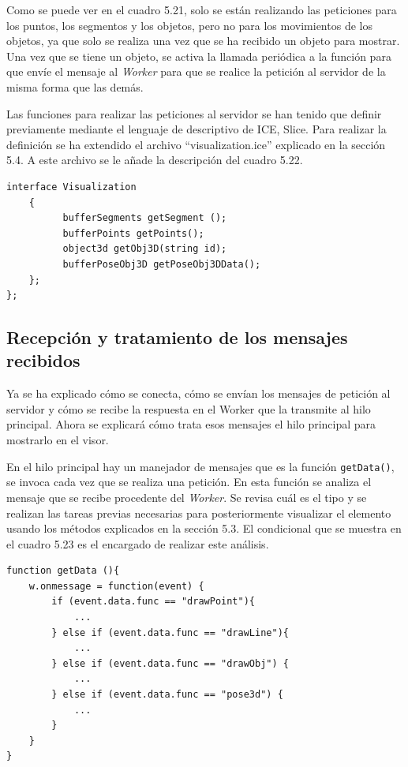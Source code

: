 Como se puede ver en el cuadro 5.21, solo se están realizando las peticiones para los puntos, los segmentos y los objetos, pero no para los movimientos de los objetos, ya que solo se realiza una vez que se ha recibido un objeto para mostrar. Una vez que se tiene un objeto, se activa la llamada periódica a la función para que envíe el mensaje al \textit{Worker} para que se realice la petición al servidor de la misma forma que las demás.

Las funciones para realizar las peticiones al servidor se han tenido que definir previamente mediante el lenguaje de descriptivo de ICE, Slice. Para realizar la definición se ha extendido el archivo ``visualization.ice'' explicado en la sección 5.4. A este archivo se le añade la descripción del cuadro 5.22.

\begin{lstlisting}[caption= Código añadido a las definiciones Slice creadas, label=cod.extensionslice]
interface Visualization
	{
	      bufferSegments getSegment ();
	      bufferPoints getPoints();
	      object3d getObj3D(string id);
	      bufferPoseObj3D getPoseObj3DData();
	};
};

\end{lstlisting}

\subsection{Recepción y tratamiento de los mensajes recibidos}
Ya se ha explicado cómo se conecta, cómo se envían los mensajes de petición al servidor y cómo se recibe la respuesta en el Worker que la transmite al hilo principal. Ahora se explicará cómo trata esos mensajes el hilo principal para mostrarlo en el visor.

En el hilo principal hay un manejador de mensajes que es la función \texttt{getData()}, se invoca cada vez que se realiza una petición. En esta función se analiza el mensaje que se recibe procedente del \textit{Worker}. Se revisa cuál es el tipo y se realizan las tareas previas necesarias para posteriormente visualizar el elemento usando los métodos explicados en la sección 5.3. El condicional que se muestra en el cuadro 5.23 es el encargado de realizar este análisis.

\begin{lstlisting}[caption= Manejador que analiza los mensajes recibidos, label=cod.manejador]
function getData (){
	w.onmessage = function(event) {
		if (event.data.func == "drawPoint"){
			...
		} else if (event.data.func == "drawLine"){
			...
		} else if (event.data.func == "drawObj") {
			...
		} else if (event.data.func == "pose3d") {
			...
		}
	}
}
\end{lstlisting}

